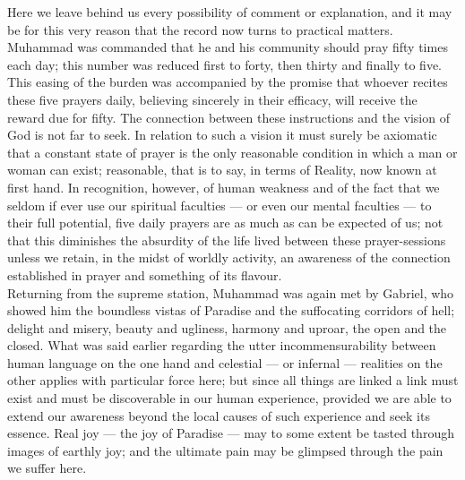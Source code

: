 \documentclass[10pt, twoside,openright]{book}
\begin{document}
Here we leave behind us every possibility of comment or explanation, and it may be for this very 
reason that the record now turns to practical matters. Muhammad was commanded that he and his 
community should pray fifty times each day; this number was reduced first to forty, then thirty and 
finally to five. This easing of the burden was accompanied by the promise that whoever recites these 
five prayers daily, believing sincerely in their efficacy, will receive the reward due for fifty. The 
connection between these instructions and the vision of God is not far to seek. In relation to such a 
vision it must surely be axiomatic that a constant state of prayer is the only reasonable condition 
in which a man or woman can exist; reasonable, that is to say, in terms of Reality, now known at 
first hand. In recognition, however, of human weakness and of the fact that we seldom if ever use 
our spiritual faculties --- or even our mental faculties --- to their full potential, five daily prayers 
are as much as can be expected of us; not that this diminishes the absurdity of the life lived 
between these prayer\hyp{}sessions unless we retain, in the midst of worldly activity, an awareness of the 
connection established in prayer and something of its flavour. \\

Returning from the supreme station, Muhammad was again met by Gabriel, who showed him the boundless vistas of Paradise and the suffocating corridors of hell; delight and misery, beauty and ugliness, 
harmony and uproar, the open and the closed. What was said earlier regarding the utter 
incommensurability between human language on the one hand and celestial --- or infernal --- realities on 
the other applies with particular force here; but since all things are linked a link must exist and 
must be discoverable in our human experience, provided we are able to extend our awareness beyond the 
local causes of such experience and seek its essence. Real joy --- the joy of Paradise --- may to some 
extent be tasted through images of earthly joy; and the ultimate pain may be glimpsed through the 
pain we suffer here. \\
\end{document}
